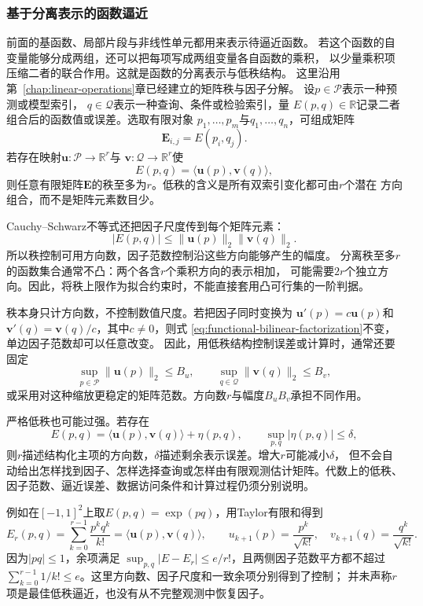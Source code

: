 \subsubsection{基于分离表示的函数逼近}
\label{sec:functional-separated-approximation}

前面的基函数、局部片段与非线性单元都用来表示待逼近函数。
若这个函数的自变量能够分成两组，还可以把每项写成两组变量各自函数的乘积，
以少量乘积项压缩二者的联合作用。这就是函数的分离表示与低秩结构。
这里沿用第~\ref{chap:linear-operations}章已经建立的矩阵秩与因子分解。
设$p\in\mathcal{P}$表示一种预测或模型索引，
$q\in\mathcal{Q}$表示一种查询、条件或检验索引，量
$E(p,q)\in\mathbb{R}$记录二者组合后的函数值或误差。选取有限对象
$p_1,\ldots,p_m$与$q_1,\ldots,q_n$，可组成矩阵
\[
  \bm{E}_{i,j}=E(p_i,q_j).
\]
若存在映射$\bm{u}:\mathcal{P}\to\mathbb{R}^r$与
$\bm{v}:\mathcal{Q}\to\mathbb{R}^r$使
\begin{equation}
  E(p,q)
  =
  \langle\bm{u}(p),\bm{v}(q)\rangle,
  \label{eq:functional-bilinear-factorization}
\end{equation}
则任意有限矩阵$\bm{E}$的秩至多为$r$。低秩的含义是所有双索引变化都可由$r$个潜在
方向组合，而不是矩阵元素数目少。

Cauchy--Schwarz不等式还把因子尺度传到每个矩阵元素：
\[
  |E(p,q)|
  \leq
  \lVert\bm{u}(p)\rVert_2
  \lVert\bm{v}(q)\rVert_2.
\]
所以秩控制可用方向数，因子范数控制沿这些方向能够产生的幅度。
分离秩至多$r$的函数集合通常不凸：两个各含$r$个乘积方向的表示相加，
可能需要$2r$个独立方向。因此，将秩上限作为拟合约束时，不能直接套用凸可行集的一阶判据。

秩本身只计方向数，不控制数值尺度。若把因子同时变换为
$\bm{u}'(p)=c\bm{u}(p)$和
$\bm{v}'(q)=\bm{v}(q)/c$，其中$c\neq0$，则式
\eqref{eq:functional-bilinear-factorization}不变，单边因子范数却可以任意改变。
因此，用低秩结构控制误差或计算时，通常还要固定
\[
  \sup_{p\in\mathcal{P}}\lVert\bm{u}(p)\rVert_2\leq B_u,
  \qquad
  \sup_{q\in\mathcal{Q}}\lVert\bm{v}(q)\rVert_2\leq B_v,
\]
或采用对这种缩放更稳定的矩阵范数。方向数$r$与幅度$B_uB_v$承担不同作用。

严格低秩也可能过强。若存在
\[
  E(p,q)
  =
  \langle\bm{u}(p),\bm{v}(q)\rangle+\eta(p,q),
  \qquad
  \sup_{p,q}|\eta(p,q)|\leq\delta,
\]
则$r$描述结构化主项的方向数，$\delta$描述剩余表示误差。增大$r$可能减小$\delta$，
但不会自动给出怎样找到因子、怎样选择查询或怎样由有限观测估计矩阵。代数上的低秩、
因子范数、逼近误差、数据访问条件和计算过程仍须分别说明。

例如在$[-1,1]^2$上取$E(p,q)=\exp(pq)$，用Taylor有限和得到
\[
 E_r(p,q)=\sum_{k=0}^{r-1}\frac{p^kq^k}{k!}
 =\langle\bm u(p),\bm v(q)\rangle,\qquad
 u_{k+1}(p)=\frac{p^k}{\sqrt{k!}},\quad
 v_{k+1}(q)=\frac{q^k}{\sqrt{k!}}.
\]
因为$|pq|\leq1$，余项满足
$\sup_{p,q}|E-E_r|\leq e/r!$，且两侧因子范数平方都不超过
$\sum_{k=0}^{r-1}1/k!\leq e$。这里方向数、因子尺度和一致余项分别得到了控制；
并未声称$r$项是最佳低秩逼近，也没有从不完整观测中恢复因子。

